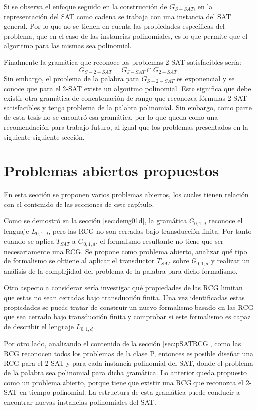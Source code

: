 \documentclass[12pt]{article}
\begin{document}
Si se observa el enfoque seguido en la construcción de $G_{S-SAT}$, en la representación del SAT como cadena se trabaja con una instancia del SAT general. Por lo que no se tienen en cuenta las propiedades específicas del problema, que en el caso de las instancias polinomiales, es lo que permite que el algoritmo para las mismas sea polinomial.

Finalmente la gramática que reconoce los problemas 2-SAT satisfacibles sería:
$$G_{S-2-SAT}=G_{S-SAT}\cap G_{2-SAT}.$$
Sin embargo, el problema de la palabra para $G_{S-2-SAT}$ es exponencial y se conoce que para el 2-SAT existe un algoritmo polinomial. Esto significa que debe existir otra gramática de concatenación de rango que reconozca fórmulas 2-SAT satisfacibles y tenga problema de la palabra polinomial. Sin embargo, como parte de esta tesis no se encontró esa gramática, por lo que queda como una recomendación para trabajo futuro, al igual que los problemas presentados en la siguiente siguiente sección.

\section{Problemas abiertos propuestos}

En esta sección se proponen varios problemas abiertos, los cuales tienen relación con el contenido de las secciones
de este capítulo.

Como se demostró en la sección \ref{sec:demg01d}, la gramática $G_{0,1,d}$ reconoce el lenguaje $L_{0,1,d}$, pero las RCG no son cerradas bajo transducción finita. Por tanto cuando se aplica $T_{SAT}$ a $G_{0,1,d}$, el formalismo resultante no tiene que ser necesariamente una RCG. Se propone como problema abierto, analizar qué tipo de formalismo se obtiene al aplicar el transductor $T_{SAT}$ sobre $G_{0,1,d}$ y realizar un análisis de la complejidad del problema de la palabra para dicho formalismo.

Otro aspecto a considerar sería investigar qué propiedades de las RCG limitan que estas no sean cerradas bajo transducción finita.  Una vez identificadas estas propiedades se puede tratar de construir un nuevo formalismo basado en las RCG que sea cerrado bajo transducción finita y comprobar si este formalismo es capaz de describir el lenguaje $L_{0,1,d}$.

Por otro lado, analizando el contenido de la sección \ref{sec:pSATRCG}, como las RCG reconocen todos los problemas de la clase P, entonces es posible diseñar una RCG para el 2-SAT y para cada instancia polinomial del SAT, donde el problema de la palabra sea polinomial para dicha gramática.  Lo anterior queda propuesto como un problema abierto, porque tiene que existir una RCG que reconozca el 2-SAT en tiempo polinomial. La estructura de esta gramática puede conducir a encontrar nuevas instancias polinomiales del SAT.
\end{document}
